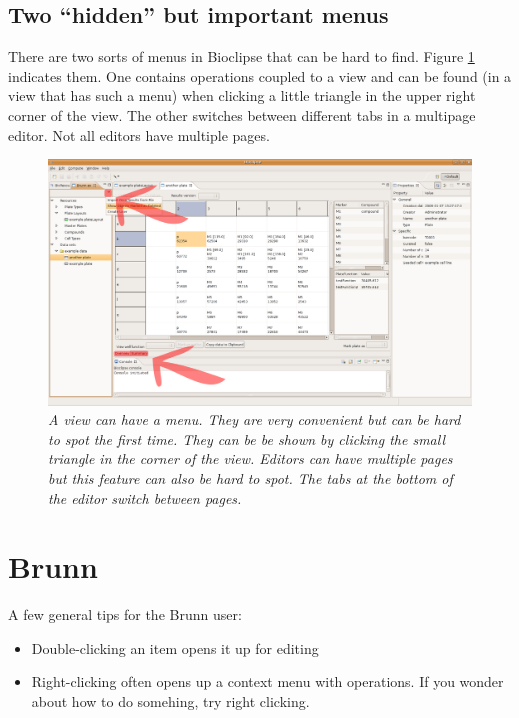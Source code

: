 \documentclass[a4paper,10pt]{article}
\begin{document}
        \subsection{Two ``hidden'' but important menus}

            There are two sorts of menus in Bioclipse that can be
            hard to find. Figure \ref{viewMenu} indicates them. One contains
            operations coupled to a view and can be found (in a view that has
            such a menu) when clicking a little triangle in the upper right
            corner of the view. The other switches between different tabs in a
            multipage editor. Not all editors have multiple pages.
            \begin{figure}[htbp]
                \begin{center}
                    \includegraphics[width=1\textwidth]{images/twoMenues.png}
                \end{center}
                \caption{\textit{A view can have a menu. They are very
                    convenient but can be hard to spot the first time. They can
                    be be shown by clicking the small triangle in the corner of
                    the view. Editors can have multiple pages but this feature
                    can also be hard to spot. The tabs at the bottom of the
                    editor switch between pages.}}
                \label{viewMenu}
            \end{figure}

    \section{Brunn}
        
         \begin{minipage}{1\textwidth}
            A few general tips for the Brunn user:
            \begin{itemize}
                \item Double-clicking an item opens it up for editing
                \item Right-clicking often opens up a context menu with
                    operations. If you wonder about how to do somehing, try
                    right clicking.
            \end{itemize}
         \end{minipage}
\end{document}
